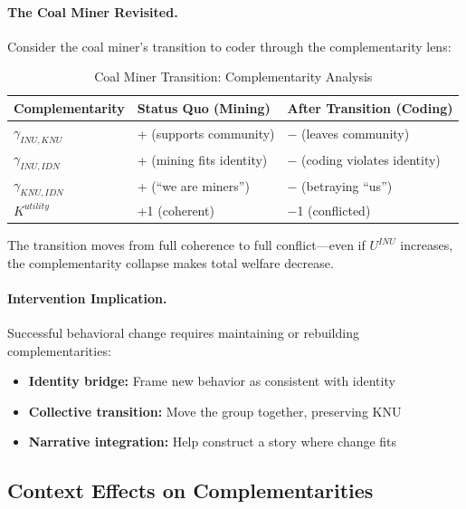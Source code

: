 \paragraph{The Coal Miner Revisited.}
Consider the coal miner's transition to coder through the complementarity lens:

\begin{table}[htbp]
\centering
\caption{Coal Miner Transition: Complementarity Analysis}
\label{tab:app-c-miner-complementarity}
\renewcommand{\arraystretch}{1.3}
\begin{tabular}{@{}lll@{}}
\toprule
\textbf{Complementarity} & \textbf{Status Quo (Mining)} & \textbf{After Transition (Coding)} \\
\midrule
$\gamma_{INU,KNU}$ & + (supports community) & $-$ (leaves community) \\
$\gamma_{INU,IDN}$ & + (mining fits identity) & $-$ (coding violates identity) \\
$\gamma_{KNU,IDN}$ & + (``we are miners'') & $-$ (betraying ``us'') \\
\midrule
$K^{utility}$ & +1 (coherent) & $-$1 (conflicted) \\
\bottomrule
\end{tabular}
\end{table}

The transition moves from full coherence to full conflict---even if $U^{INU}$ 
increases, the complementarity collapse makes total welfare decrease.

\paragraph{Intervention Implication.}
Successful behavioral change requires maintaining or rebuilding complementarities:
\begin{itemize}
\item \textbf{Identity bridge:} Frame new behavior as consistent with identity
\item \textbf{Collective transition:} Move the group together, preserving KNU
\item \textbf{Narrative integration:} Help construct a story where change fits
\end{itemize}

\subsection{Context Effects on Complementarities}

